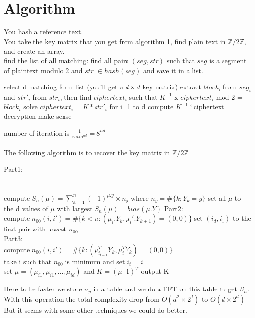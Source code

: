 \documentclass{article}
\begin{document}
\section{Algorithm}
You hash a reference text.\\
You take the key matrix that you get from algorithm 1, find plain text in $\mathbb{Z}/2\mathbb{Z}$, and create an array.\\
find the list of all matching: find all pairs $(seg,str)$ such that $seg$ is a segment of plaintext modulo 2 and $str$ $\in hash(seg)$ and save it in a list.\\
\begin{algorithmic}[1]
	\REPEAT
\STATE select d matching form list (you'll get a $d\times d$ key matrix)
	\STATE extract $block_{i}$ from $seg_{i}$ and $str'_{i}$ from $str_{i}$,
	\STATE then find $ciphertext_{i}$ such that $K^{-1}$ x $ciphertext_{i}$ mod 2 = $block_{i}$
\ENDFOR
\STATE solve $ciphertext_{i} = K * str'_{i}$ for i=1 to d
\STATE compute $K^{-1} * $ciphertext
\UNTIL decryption make sense
\end{algorithmic}
number of iteration is $ \frac{1}{ratio^{nd}} = 8^{nd}$
\\
\\
The following algorithm is to recover the key matrix in $\mathbb{Z}/2\mathbb{Z}$\\
\begin{algorithmic}[1]
\STATE Part1:\\
\\
\\
\FORALL{$\mu$}
	\STATE compute $S_n(\mu) = \sum_{k=1}^{n}{(-1)^{\mu.y} \times n_y}$ where $n_y=\#\{k;Y_k=y\}$
\ENDFOR
\STATE set all $\mu$ to the d values of $\mu$ with largest $S_n(\mu)=bias(\mu.Y)$
\STATE Part2:\\
	\STATE compute $n_{00}(i,i')=\#\{k<n:(\mu_i .Y_k,\mu_i'.Y_{k+1})=(0,0)\}$
\ENDFOR
\STATE set $(i_d,i_1)$ to the first pair with lowest $n_{00}$
\\
\STATE Part3:\\
		\STATE compute $n_{00}(i,i{'})=\#\{k:(\mu^{T}_{i_{t-1}}Y_{k},\mu^{T}_{i}Y_{k})=(0,0)\}$\\
	\ENDFOR
	\STATE take i such that $n_{00}$ is minimum and set $i_t=i$\\
\ENDFOR
\STATE set $\mu = (\mu_{i1},\mu_{i1},...,\mu_{id})$ and $K=(\mu^-1)^T$
\STATE output K
\end{algorithmic}
Here to be faster we store $n_y$ in a table and we do a FFT on this table to get $S_n$. With this operation the total complexity drop from $O(d^2 \times 2^d)$ to $O(d \times 2^d)$
But it seems with some other techniques we could do better.
\end{document}
